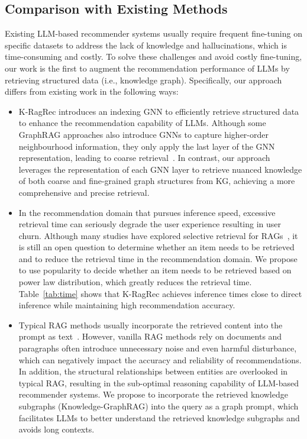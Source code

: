 \subsection{Comparison with Existing Methods}
Existing LLM-based recommender systems usually require frequent fine-tuning on specific datasets to address the lack of knowledge and hallucinations, which is time-consuming and costly. To solve these challenges and avoid costly fine-tuning, our work is the first to augment the recommendation performance of LLMs by retrieving structured data (i.e., knowledge graph). Specifically, our approach differs from existing work in the following ways:
\vspace{-0.1in}
 \begin{itemize} [leftmargin=*] 
\setlength{\itemsep}{0pt}
\setlength{\parsep}{0pt}
\setlength{\parskip}{0pt}
\item K-RagRec introduces an indexing GNN to efficiently retrieve structured data to enhance the recommendation capability of LLMs. Although some GraphRAG approaches also introduce GNNs to capture higher-order neighbourhood information, they only apply the last layer of the GNN representation, leading to coarse retrieval~\citep{he2024g, mavromatis2024gnn}. In contrast, our approach leverages the representation of each GNN layer to retrieve nuanced knowledge of both coarse and fine-grained graph structures from KG, achieving a more comprehensive and precise retrieval.
\item In the recommendation domain that pursues inference speed, excessive retrieval time can seriously degrade the user experience resulting in user churn. Although many studies have explored selective retrieval for RAGs~\citep{yan2024corrective,jiang2023active}, it is still an open question to determine whether an item needs to be retrieved and to reduce the retrieval time in the recommendation domain. We propose to use popularity to decide whether an item needs to be retrieved based on power law distribution, which greatly reduces the retrieval time. Table~\ref{tab:time} shows that K-RagRec achieves inference times close to direct inference while maintaining high recommendation accuracy.
\item Typical RAG methods usually incorporate the retrieved content into the prompt as text~\citep{wu2023retrieve,baek2023knowledge}. However, vanilla RAG methods rely on documents and paragraphs often introduce unnecessary noise and even harmful disturbance, which can negatively impact the accuracy and reliability of recommendations. In addition, the structural relationships between entities are overlooked in typical RAG, resulting in the sub-optimal reasoning capability of LLM-based recommender systems. We propose to incorporate the retrieved knowledge subgraphs (Knowledge-GraphRAG) into the query as a graph prompt, which facilitates LLMs to better understand the retrieved knowledge subgraphs and avoids long contexts.
\end{itemize}

